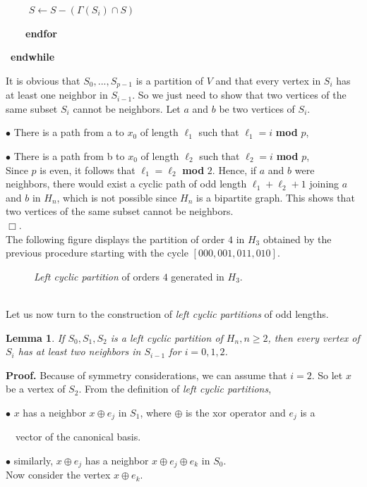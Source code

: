 \documentclass{article}
\newtheorem{lemma}{Lemma}
\begin{document}
\ \ \ \ \hspace{2mm} $S\leftarrow S-(\Gamma (S_i)\cap S)$

\ \ \ \ {\bf endfor}

\ {\bf endwhile}

It is obvious that $S_0,...,S_{p-1}$ is a partition of $V$ and that every
vertex in $S_i$ has at least one neighbor in $S_{i-1}$. So we just need to show
that two vertices of the same subset $S_i$ cannot be neighbors. Let $a$ and
$b$ be two vertices of $S_i$.

$\bullet$ There is a path from a to $x_0$ of length $\ell _1$ such that $\ell
_1=i$ {\bf  mod }$p$,

$\bullet$ There is a path from b to $x_0$ of length $\ell _2$ such that $\ell
_2=i$ {\bf  mod }$p$,\\
Since $p$ is  even, it follows that $\ell _1=\ell _2$ {\bf mod }$2$. Hence, if
$a$ and $b$ were neighbors, there would exist a cyclic path of odd length
${\ell}_1+{\ell}_2+1$ joining $a$ and $b$ in $H_n$, which is not possible
since $H_n$ is a bipartite graph. This shows that two vertices of the same
subset cannot be neighbors.\\
$\Box$.\\
The following figure displays the partition of order $4$ in $H_3$ obtained by
the previous procedure starting with the cycle $[000,001,011,010]$.
\begin{figure}[htbp]
\centering
\epsfxsize=6cm
\caption{\label{tracegraph} {\em Left cyclic partition} of orders $4$ generated in $H_3$.}
\end{figure}\\
Let us now turn to the construction of {\em left cyclic partitions} of odd
lengths.

\begin{lemma}  \label{lem:23}
If $S_0,S_1,S_2$ is a {\em left cyclic partition} of $H_n,n\geq 2$, then every vertex
of $S_i$ has at least two neighbors in $S_{i-1}$ for $i=0,1,2$.
\end{lemma}
{\bf Proof.} Because of symmetry considerations, we can assume that $i=2$. So
let $x$ be a vertex of $S_2$. From the definition of {\em left cyclic
  partitions},

$\bullet$ $x$
has a neighbor $x\oplus e_j$ in $S_1$, where $\oplus$ is the {\sc xor}
operator and $e_j$ is a

\ \ vector of the canonical basis.

$\bullet$ similarly, $x\oplus e_j$  has a neighbor
$x\oplus e_j\oplus e_k$ in $S_0$. \\
Now consider the vertex $x\oplus e_k$. 
\end{document}
